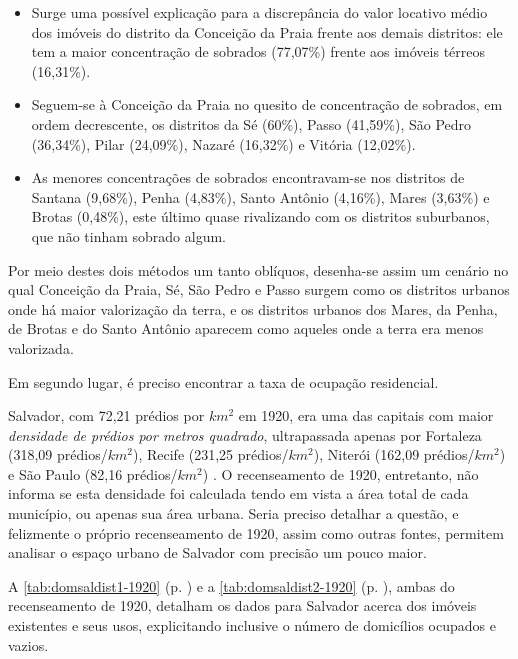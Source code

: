 \begin{itemize}
\item Surge uma possível explicação para a discrepância do valor locativo médio dos imóveis do distrito da Conceição da Praia frente aos demais distritos: ele tem a maior concentração de sobrados (77,07\%) frente aos imóveis térreos (16,31\%).
\item Seguem-se à Conceição da Praia no quesito de concentração de sobrados, em ordem decrescente, os distritos da Sé (60\%), Passo (41,59\%), São Pedro (36,34\%), Pilar (24,09\%), Nazaré (16,32\%) e Vitória (12,02\%).
\item As menores concentrações de sobrados encontravam-se nos distritos de Santana (9,68\%), Penha (4,83\%), Santo Antônio (4,16\%), Mares (3,63\%) e Brotas (0,48\%), este último quase rivalizando com os distritos suburbanos, que não tinham sobrado algum.
\end{itemize}

Por meio destes dois métodos um tanto oblíquos, desenha-se assim um cenário no qual Conceição da Praia, Sé, São Pedro e Passo surgem como os distritos urbanos onde há maior valorização da terra, e os distritos urbanos dos Mares, da Penha, de Brotas e do Santo Antônio aparecem como aqueles onde a terra era menos valorizada.

Em segundo lugar, é preciso encontrar a taxa de ocupação residencial.

Salvador, com 72,21 prédios por $km^{2}$ em 1920, era uma das capitais com maior \textit{densidade de prédios por metros quadrado}, ultrapassada apenas por Fortaleza (318,09 prédios/$km^{2}$), Recife (231,25 prédios/$km^{2}$), Niterói (162,09 prédios/$km^{2}$) e São Paulo (82,16 prédios/$km^{2}$) \cite[p.~XV]{brasil_censo46_1920}. O recenseamento de 1920, entretanto, não informa se esta densidade foi calculada tendo em vista a área total de cada município, ou apenas sua área urbana. Seria preciso detalhar a questão, e felizmente o próprio recenseamento de 1920, assim como outras fontes, permitem analisar o espaço urbano de Salvador com precisão um pouco maior.



A \autoref{tab:domsaldist1-1920} (p. \pageref{tab:domsaldist1-1920}) e a \autoref{tab:domsaldist2-1920} (p. \pageref{tab:domsaldist2-1920}), ambas do recenseamento de 1920, detalham os dados para Salvador acerca dos imóveis existentes e seus usos, explicitando inclusive o número de domicílios ocupados e vazios.

